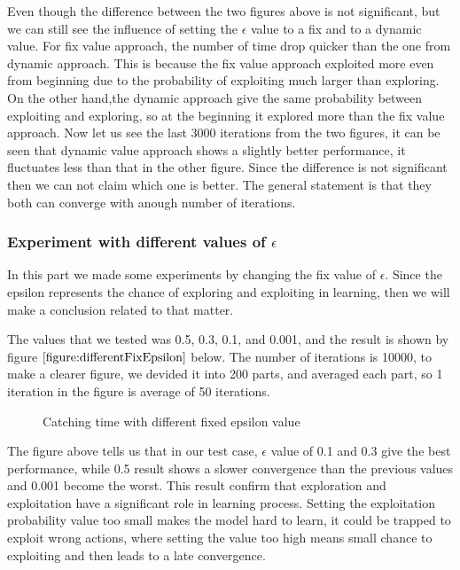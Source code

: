 \documentclass[paper=a4, fontsize=11pt]{scrartcl}
\numberwithin{equation}{section}		%
\numberwithin{figure}{section}			%
\numberwithin{table}{section}				%
\begin{document}
Even though the difference between the two figures above is not significant, but we can still see the influence of setting the $\epsilon$ value to a fix and to a dynamic value. For fix value approach, the number of time drop quicker than the one from dynamic approach. This is because the fix value approach exploited more even from beginning due to the probability of exploiting much larger than exploring. On the other hand,the dynamic approach give the same probability between exploiting and exploring, so at the beginning it explored more than the fix value approach. Now let us see the last 3000 iterations from the two figures, it can be seen that dynamic value approach shows a slightly better performance, it fluctuates less than that in the other figure. Since the difference is not significant then we can not claim which one is better. The general statement is that they both can converge with anough number of iterations.

\subsubsection*{Experiment with different values of $\epsilon$}
In this part we made some experiments by changing the fix value of $\epsilon$. Since the epsilon represents the chance of exploring and exploiting in learning, then we will make a conclusion related to that matter. 

The values that we tested was 0.5, 0.3, 0.1, and 0.001, and the result is shown by figure $\ref{figure:differentFixEpsilon}$ below. The number of iterations is  10000, to make a clearer figure, we devided it into 200 parts, and averaged each part, so 1 iteration in the figure is average of 50 iterations. 
\begin{figure}[H] \centering
\caption{Catching time with different fixed epsilon value} \label{figure:differentFixEpsilon}
\end{figure}

The figure above tells us that in our test case, $\epsilon$ value of 0.1 and 0.3 give the best performance, while 0.5 result shows a slower convergence than the previous values and 0.001 become the worst. This result confirm that exploration and exploitation have a significant role in learning process. Setting the exploitation probability value too small makes the model hard to learn, it could be trapped to exploit wrong actions, where setting the value too high means small chance to exploiting and then leads to a late convergence.
\end{document}
